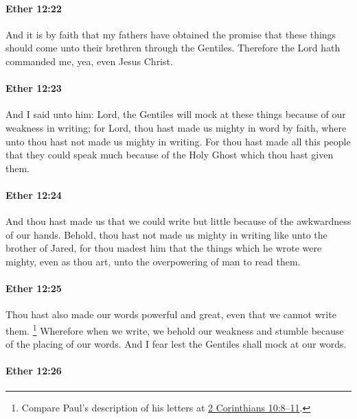 		\paragraph{Ether 12:22} %
			\label{ETHER-12-22}

			And it is by faith that my fathers have obtained the promise
			that these things should come unto their brethren through the Gentiles.
			Therefore the Lord hath commanded me,
			yea, even Jesus Christ.

		\paragraph{Ether 12:23} %
			\label{ETHER-12-23}

			And I said unto him:
			Lord, the Gentiles will mock at these things
			because of our weakness in writing;
			for Lord, thou hast made us mighty in word by faith,
			where unto thou hast not made us mighty in writing.
			For thou hast made all this people
			that they could speak much because of the Holy Ghost
			which thou hast given them.

		\paragraph{Ether 12:24} %
			\label{ETHER-12-24}

			And thou hast made us that we could write but little
			because of the awkwardness of our hands.
			Behold, thou hast not made us mighty in writing
			like unto the brother of Jared,
			for thou madest him that the things which he wrote were mighty,
			even as thou art,
			unto the overpowering of man to read them.

		\paragraph{Ether 12:25} %
			\label{ETHER-12-25}

			Thou hast also made our words powerful and great,
			even that we cannot write them.
				\footnote{%
					Compare Paul's description of his letters at \hyperref[2CORINTHIANS-10-8]{2 Corinthians 10:8--11}.
					}%
			Wherefore when we write,
			we behold our weakness and stumble because of the placing of our words.
			And I fear lest the Gentiles shall mock at our words.

		\paragraph{Ether 12:26} %
			\label{ETHER-12-26}

